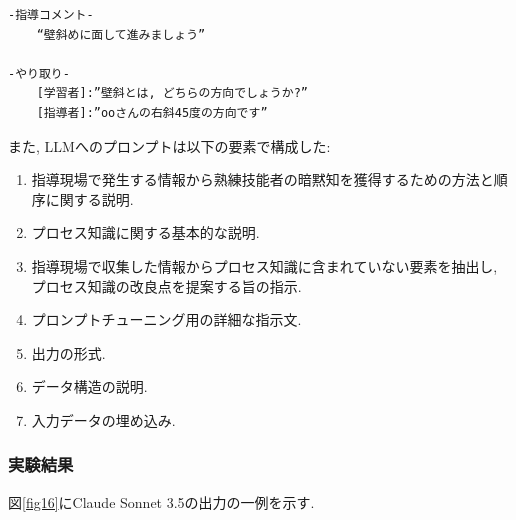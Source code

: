 \label{fig14}




\begin{tcolorbox}[breakable, colback=white, colframe=black]
    \begin{verbatim}
-指導コメント-
    “壁斜めに面して進みましょう”

-やり取り-
    [学習者]:”壁斜とは, どちらの方向でしょうか?”
    [指導者]:”ooさんの右斜45度の方向です”
    \end{verbatim}
\end{tcolorbox}
    
\label{fig15}



また, LLMへのプロンプトは以下の要素で構成した:
\begin{enumerate}
    \item 指導現場で発生する情報から熟練技能者の暗黙知を獲得するための方法と順序に関する説明.
    \item プロセス知識に関する基本的な説明.
    \item 指導現場で収集した情報からプロセス知識に含まれていない要素を抽出し, プロセス知識の改良点を提案する旨の指示.
    \item プロンプトチューニング用の詳細な指示文.
    \item 出力の形式.
    \item データ構造の説明.
    \item 入力データの埋め込み.	
\end{enumerate}



\subsubsection{実験結果}
図\ref{fig16}にClaude Sonnet 3.5の出力の一例を示す.

